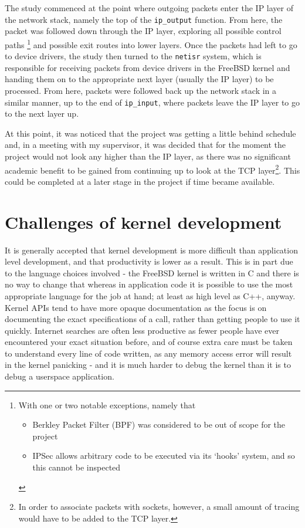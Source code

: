 \documentclass[a4paper,12pt,twoside,openright]{report}
\begin{document}
	The study commenced at the point where outgoing packets enter the IP layer of the network stack, namely the top of the \verb|ip_output| function. From here, the packet was followed down through the IP layer, exploring all possible control paths
	\footnote{
		With one or two notable exceptions, namely that
		\begin{itemize}
			\item Berkley Packet Filter (BPF) was considered to be out of scope for the project
			\item IPSec allows arbitrary code to be executed via its `hooks' system, and so this cannot be inspected
		\end{itemize}
	}
	and possible exit routes into lower layers. Once the packets had left to go to device drivers, the study then turned to the \texttt{netisr} system, which is responsible for receiving packets from device drivers in the FreeBSD kernel and handing them on to the appropriate next layer (usually the IP layer) to be processed. From here, packets were followed back up the network stack in a similar manner, up to the end of \verb|ip_input|, where packets leave the IP layer to go to the next layer up.
	
	At this point, it was noticed that the project was getting a little behind schedule and, in a meeting with my supervisor, it was decided that for the moment the project would not look any higher than the IP layer, as there was no significant academic benefit to be gained from continuing up to look at the TCP layer\footnote{In order to associate packets with sockets, however, a small amount of tracing would have to be added to the TCP layer.}. This could be completed at a later stage in the project if time became available.
	
	\section{Challenges of kernel development}
	
	It is generally accepted that kernel development is more difficult than application level development, and that productivity is lower as a result. This is in part due to the language choices involved - the FreeBSD kernel is written in C and there is no way to change that whereas in application code it is possible to use the most appropriate language for the job at hand; at least as high level as C++, anyway. Kernel APIs tend to have more opaque documentation as the focus is on documenting the exact specifications of a call, rather than getting people to use it quickly. Internet searches are often less productive as fewer people have ever encountered your exact situation before, and of course extra care must be taken to understand every line of code written, as any memory access error will result in the kernel panicking - and it is much harder to debug the kernel than it is to debug a userspace application.
	
\end{document}

